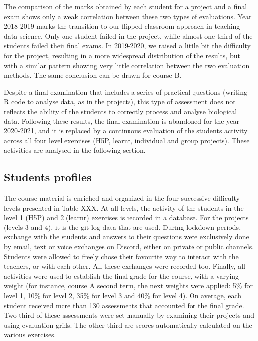 \documentclass[
]{article}
\begin{document}
The comparison of the marks obtained by each student for a project and a
final exam shows only a weak correlation between these two types of
evaluations. Year 2018-2019 marks the transition to our flipped
classroom approach in teaching data science. Only one student failed in
the project, while almost one third of the students failed their final
exams. In 2019-2020, we raised a little bit the difficulty for the
project, resulting in a more widespread distribution of the results, but
with a similar pattern showing very little correlation between the two
evaluation methods. The same conclusion can be drawn for course B.

Despite a final examination that includes a series of practical
questions (writing R code to analyse data, as in the projects), this
type of assessment does not reflects the ability of the students to
correctly process and analyse biological data. Following these results,
the final examination is abandoned for the year 2020-2021, and it is
replaced by a continuous evaluation of the students activity across all
four level exercises (H5P, learnr, individual and group projects). These
activities are analysed in the following section.

\hypertarget{students-profiles}{%
\subsection{Students profiles}\label{students-profiles}}

The course material is enriched and organized in the four successive
difficulty levels presented in Table XXX. At all levels, the activity of
the students in the level 1 (H5P) and 2 (learnr) exercises is recorded
in a database. For the projects (levels 3 and 4), it is the git log data
that are used. During lockdown periods, exchange with the students and
answers to their questions were exclusively done by email, text or voice
exchanges on Discord, either on private or public channels. Students
were allowed to freely chose their favourite way to interact with the
teachers, or with each other. All these exchanges were recorded too.
Finally, all activities were used to establish the final grade for the
course, with a varying weight (for instance, course A second term, the
next weights were applied: 5\% for level 1, 10\% for level 2, 35\% for
level 3 and 40\% for level 4). On average, each student received more
than 130 assessments that accounted for the final grade. Two third of
these assessments were set manually by examining their projects and
using evaluation grids. The other third are scores automatically
calculated on the various exercises.
\end{document}
